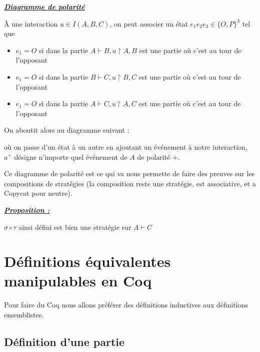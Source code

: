 \documentclass[a4paper,12ptCOUCOU
]{article}
\newlength{\mydepth}
\newlength{\myheight}
\newenvironment{answer}[1]
{\vspace{0.5cm}\begin{minipage}{\linewidth}\textbf{\textit{\underline{#1}}}\par\begin{lrbox}{\mybox}\quad\begin{minipage}{\linewidth}\color{black}\setlength{\parskip}{10pt}}
{\end{minipage}\end{lrbox}
\settodepth{\mydepth}{\usebox{\mybox}}
\settoheight{\myheight}{\usebox{\mybox}}
\addtolength{\myheight}{\mydepth}
\noindent\makebox[0pt]{
  \color{gray}\hspace{-0pt}\rule[-\mydepth]{1pt}{\myheight}}
\usebox{\mybox}
\end{minipage}
  }
\begin{document}
\begin{answer}{Diagramme de polarité}

À une interaction $u \in I(A,B,C)$, on peut associer un état
$e_1 e_2 e_3 \in \{O,P\}^3$ tel que
\begin{itemize}
\item $e_1 = O$ si dans la partie $A\vdash B, u\upharpoonright A,B $ est une partie où c'est au tour de l'opposant
\item $e_1 = O$ si dans la partie $B\vdash C, u\upharpoonright B,C $ est une partie où c'est au tour de l'opposant
\item $e_1 = O$ si dans la partie $A\vdash C, u\upharpoonright A,C $ est une partie où c'est au tour de l'opposant
\end{itemize}

On aboutit alors au diagramme suivant :

où on passe d'un état à un autre en ajoutant un événement à notre interaction,
$a^+$ désigne n'importe quel événement de $A$ de polarité $+$.

\end{answer}

Ce diagramme de polarité est ce qui va nous permette de faire des preuves sur les
compositions de stratégies (la composition reste une stratégie, est associative,
et a Copycat pour neutre).

\begin{answer}{Proposition :}
$\sigma \circ \tau$ ainsi défini est bien une stratégie sur $A \vdash C$
\end{answer}
\newpage
\section{Définitions équivalentes manipulables en Coq}

Pour faire du Coq nous allons préférer des définitions inductives aux
définitions ensemblistes.

\subsection{Définition d'une partie}
\end{document}
